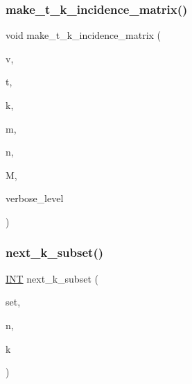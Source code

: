 \subsubsection{\texorpdfstring{make\+\_\+t\+\_\+k\+\_\+incidence\+\_\+matrix()}{make\_t\_k\_incidence\_matrix()}}
{\footnotesize\ttfamily void make\+\_\+t\+\_\+k\+\_\+incidence\+\_\+matrix (\begin{DoxyParamCaption}\item[{\mbox{\hyperlink{galois_8h_a09fddde158a3a20bd2dcadb609de11dc}{I\+NT}}}]{v,  }\item[{\mbox{\hyperlink{galois_8h_a09fddde158a3a20bd2dcadb609de11dc}{I\+NT}}}]{t,  }\item[{\mbox{\hyperlink{galois_8h_a09fddde158a3a20bd2dcadb609de11dc}{I\+NT}}}]{k,  }\item[{\mbox{\hyperlink{galois_8h_a09fddde158a3a20bd2dcadb609de11dc}{I\+NT}} \&}]{m,  }\item[{\mbox{\hyperlink{galois_8h_a09fddde158a3a20bd2dcadb609de11dc}{I\+NT}} \&}]{n,  }\item[{\mbox{\hyperlink{galois_8h_a09fddde158a3a20bd2dcadb609de11dc}{I\+NT}} $\ast$\&}]{M,  }\item[{\mbox{\hyperlink{galois_8h_a09fddde158a3a20bd2dcadb609de11dc}{I\+NT}}}]{verbose\+\_\+level }\end{DoxyParamCaption})}

\mbox{\label{combinatorics_8_c_a775056f4f5ce3fe0bb7f9db279934c9b}} 
\subsubsection{\texorpdfstring{next\+\_\+k\+\_\+subset()}{next\_k\_subset()}}
{\footnotesize\ttfamily \mbox{\hyperlink{galois_8h_a09fddde158a3a20bd2dcadb609de11dc}{I\+NT}} next\+\_\+k\+\_\+subset (\begin{DoxyParamCaption}\item[{\mbox{\hyperlink{galois_8h_a09fddde158a3a20bd2dcadb609de11dc}{I\+NT}} $\ast$}]{set,  }\item[{\mbox{\hyperlink{galois_8h_a09fddde158a3a20bd2dcadb609de11dc}{I\+NT}}}]{n,  }\item[{\mbox{\hyperlink{galois_8h_a09fddde158a3a20bd2dcadb609de11dc}{I\+NT}}}]{k }\end{DoxyParamCaption})}

